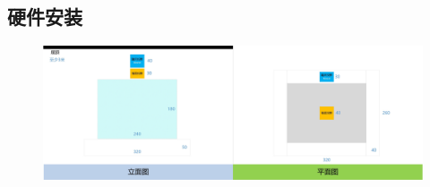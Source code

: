 \documentclass[11pt]{article}
\makeatletter
\def\maxwidth{\ifdim\Gin@nat@width>\linewidth\linewidth
    \else\Gin@nat@width\fi}
\let\Oldincludegraphics\includegraphics
\renewcommand{\includegraphics}[1]{\Oldincludegraphics[width=.8\maxwidth]{#1}}
\makeatother
\begin{document}
    \subsection{硬件安装}\label{ux786cux4ef6ux5b89ux88c5}

    

    \begin{figure}
\centering
\includegraphics{111.jpg}
\caption{}
\end{figure}
\end{document}
